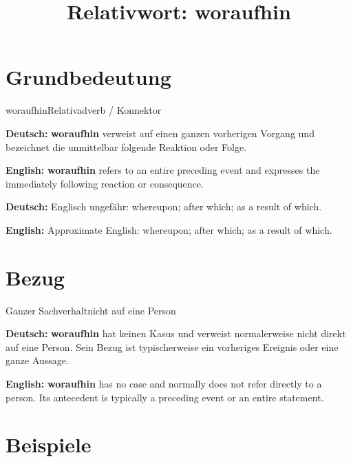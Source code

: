 \documentclass[a4paper,11pt]{article}
\title{Relativwort: \glqq woraufhin\grqq{}}
\date{}
\newcommand{\GermanText}[1]{\textbf{Deutsch: }#1\par}
\newcommand{\EnglishText}[1]{{\small\color{SoftGray}\textbf{English: }#1\par}}
\begin{document}
\maketitle

\tableofcontents

\newpage

\section{Grundbedeutung}

\begin{grammarentry}{woraufhin}{Relativadverb / Konnektor}

\GermanText{\textbf{woraufhin} verweist auf einen ganzen vorherigen Vorgang und bezeichnet die unmittelbar folgende Reaktion oder Folge.}

\EnglishText{\textbf{woraufhin} refers to an entire preceding event and expresses the immediately following reaction or consequence.}

\GermanText{Englisch ungefähr: \glqq whereupon; after which; as a result of which\grqq{}.}

\EnglishText{Approximate English: \glqq whereupon; after which; as a result of which\grqq{}.}

\end{grammarentry}

\section{Bezug}

\begin{grammarentry}{Ganzer Sachverhalt}{nicht auf eine Person}

\GermanText{\textbf{woraufhin} hat keinen Kasus und verweist normalerweise nicht direkt auf eine Person. Sein Bezug ist typischerweise ein vorheriges Ereignis oder eine ganze Aussage.}

\EnglishText{\textbf{woraufhin} has no case and normally does not refer directly to a person. Its antecedent is typically a preceding event or an entire statement.}

\end{grammarentry}

\section{Beispiele}
\end{document}
